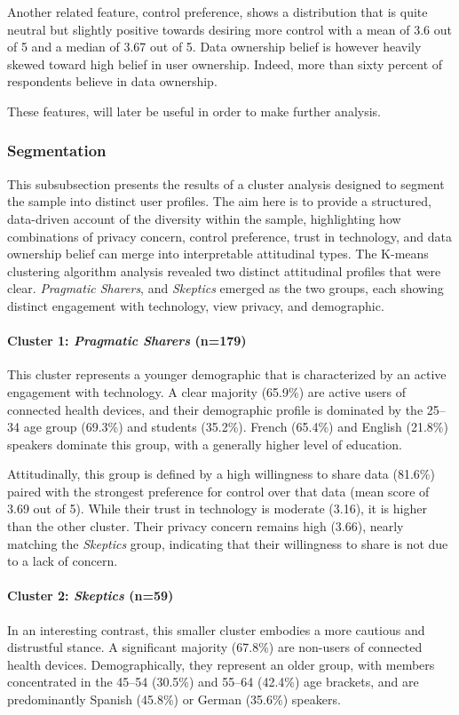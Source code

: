 	Another related feature, control preference, shows a distribution that is quite neutral but slightly positive towards desiring more control with a mean of 3.6 out of 5 and a median of 3.67 out of 5.
	Data ownership belief is however heavily skewed toward high belief in user ownership. Indeed, more than sixty percent of respondents believe in data ownership.     

	These features, will later be useful in order to make further analysis.
	\subsubsection{Segmentation}
This subsubsection presents the results of a cluster analysis designed to segment the sample into distinct user profiles. The aim here is to provide a structured, data-driven account of the diversity within the sample, highlighting how combinations of privacy concern, control preference, trust in technology, and data ownership belief can merge into interpretable attitudinal types.
The K-means clustering algorithm analysis revealed two distinct attitudinal profiles that were clear. \textit{Pragmatic Sharers}, and \textit{Skeptics} emerged as the two groups, each showing distinct engagement with technology, view privacy, and demographic.

\paragraph{Cluster 1: \textit{Pragmatic Sharers} (n=179)} This cluster represents a younger demographic that is characterized by an active engagement with technology. A clear majority (65.9\%) are active users of connected health devices, and their demographic profile is dominated by the 25--34 age group (69.3\%) and students (35.2\%). French (65.4\%) and English (21.8\%) speakers dominate this group, with a generally higher level of education.

Attitudinally, this group is defined by a high willingness to share data (81.6\%) paired with the strongest preference for control over that data (mean score of 3.69 out of 5). While their trust in technology is moderate (3.16), it is higher than the other cluster. Their privacy concern remains high (3.66), nearly matching the \textit{Skeptics} group, indicating that their willingness to share is not due to a lack of concern.

\paragraph{Cluster 2: \textit{Skeptics} (n=59)} In an interesting contrast, this smaller cluster embodies a more cautious and distrustful stance. A significant majority (67.8\%) are non-users of connected health devices. Demographically, they represent an older group, with members concentrated in the 45--54 (30.5\%) and 55--64 (42.4\%) age brackets, and are predominantly Spanish (45.8\%) or German (35.6\%) speakers.

